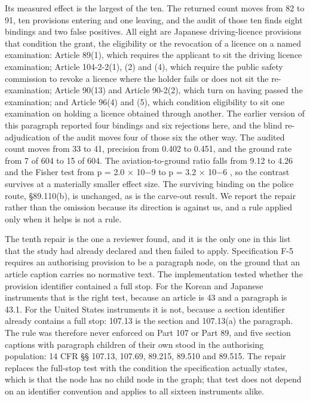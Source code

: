 Its measured effect is the largest of the ten. The returned count moves from 82 to 91, ten provisions entering and one leaving, and the audit of those ten finds eight bindings and two false positives. All eight are Japanese driving-licence provisions that condition the grant, the eligibility or the revocation of a licence on a named examination: Article 89(1), which requires the applicant to sit the driving licence examination; Article 104-2-2(1), (2) and (4), which require the public safety commission to revoke a licence where the holder fails or does not sit the re-examination; Article 90(13) and Article 90-2(2), which turn on having passed the examination; and Article 96(4) and (5), which condition eligibility to sit one examination on holding a licence obtained through another. The earlier version of this paragraph reported four bindings and six rejections here, and the blind re-adjudication of the audit moves four of those six the other way. The audited count moves from 33 to 41, precision from 0.402 to 0.451, and the ground rate from 7 of 604 to 15 of 604. The aviation-to-ground ratio falls from 9.12 to 4.26 and the Fisher test from p = 2.0 $\times$ 10$-$9 to p = 3.2 $\times$ 10$-$6 , so the contrast survives at a materially smaller effect size. The surviving binding on the police route, \S{}89.110(b), is unchanged, as is the carve-out result. We report the repair rather than the omission because its direction is against us, and a rule applied only when it helps is not a rule.

The tenth repair is the one a reviewer found, and it is the only one in this list that the study had already declared and then failed to apply. Specification F-5 requires an authorising provision to be a paragraph node, on the ground that an article caption carries no normative text. The implementation tested whether the provision identifier contained a full stop. For the Korean and Japanese instruments that is the right test, because an article is 43 and a paragraph is 43.1. For the United States instruments it is not, because a section identifier already contains a full stop: 107.13 is the section and 107.13(a) the paragraph. The rule was therefore never enforced on Part 107 or Part 89, and five section captions with paragraph children of their own stood in the authorising population: 14 CFR \S{}\S{} 107.13, 107.69, 89.215, 89.510 and 89.515. The repair replaces the full-stop test with the condition the specification actually states, which is that the node has no child node in the graph; that test does not depend on an identifier convention and applies to all sixteen instruments alike.

